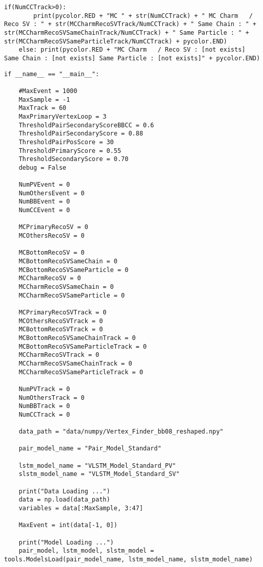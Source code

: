 \begin{lstlisting}[caption=崩壊点検出アルゴリズム用関数,label=VertexFinder1]
    if(NumCCTrack>0):
        print(pycolor.RED + "MC " + str(NumCCTrack) + " MC Charm   / Reco SV : " + str(MCCharmRecoSVTrack/NumCCTrack) + " Same Chain : " + str(MCCharmRecoSVSameChainTrack/NumCCTrack) + " Same Particle : " + str(MCCharmRecoSVSameParticleTrack/NumCCTrack) + pycolor.END)
    else: print(pycolor.RED + "MC Charm   / Reco SV : [not exists] Same Chain : [not exists] Same Particle : [not exists]" + pycolor.END)
\end{lstlisting}

\begin{lstlisting}[caption=崩壊点検出アルゴリズム, label=VertexFinder2]
if __name__ == "__main__":

    #MaxEvent = 1000
    MaxSample = -1
    MaxTrack = 60
    MaxPrimaryVertexLoop = 3
    ThresholdPairSecondaryScoreBBCC = 0.6
    ThresholdPairSecondaryScore = 0.88
    ThresholdPairPosScore = 30
    ThresholdPrimaryScore = 0.55
    ThresholdSecondaryScore = 0.70
    debug = False

    NumPVEvent = 0
    NumOthersEvent = 0
    NumBBEvent = 0
    NumCCEvent = 0

    MCPrimaryRecoSV = 0
    MCOthersRecoSV = 0

    MCBottomRecoSV = 0
    MCBottomRecoSVSameChain = 0
    MCBottomRecoSVSameParticle = 0
    MCCharmRecoSV = 0
    MCCharmRecoSVSameChain = 0
    MCCharmRecoSVSameParticle = 0

    MCPrimaryRecoSVTrack = 0
    MCOthersRecoSVTrack = 0
    MCBottomRecoSVTrack = 0
    MCBottomRecoSVSameChainTrack = 0
    MCBottomRecoSVSameParticleTrack = 0
    MCCharmRecoSVTrack = 0
    MCCharmRecoSVSameChainTrack = 0
    MCCharmRecoSVSameParticleTrack = 0
    
    NumPVTrack = 0
    NumOthersTrack = 0 
    NumBBTrack = 0
    NumCCTrack = 0

    data_path = "data/numpy/Vertex_Finder_bb08_reshaped.npy"

    pair_model_name = "Pair_Model_Standard"

    lstm_model_name = "VLSTM_Model_Standard_PV"
    slstm_model_name = "VLSTM_Model_Standard_SV"

    print("Data Loading ...")
    data = np.load(data_path)
    variables = data[:MaxSample, 3:47]
    
    MaxEvent = int(data[-1, 0])

    print("Model Loading ...")
    pair_model, lstm_model, slstm_model = tools.ModelsLoad(pair_model_name, lstm_model_name, slstm_model_name)


\end{lstlisting}
